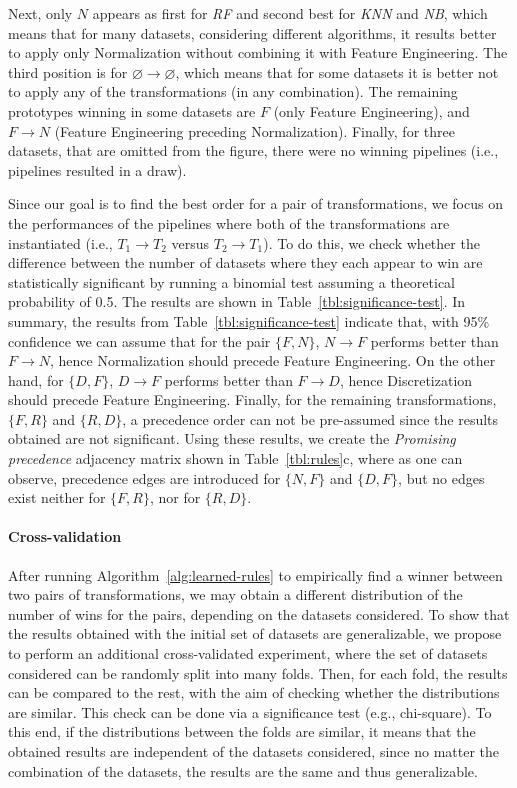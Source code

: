 \begin{example}
Next, only $N$ appears as first for \textit{RF} and second best for \textit{KNN} and \textit{NB}, which means that for many datasets, considering different algorithms, it results better to apply only Normalization without combining it with Feature Engineering. The third position is for $\varnothing\rightarrow \varnothing$, which means that for some datasets it is better not to apply any of the transformations (in any combination). The remaining prototypes winning in some datasets are $F$ (only Feature Engineering), and $F \rightarrow N$ (Feature Engineering preceding Normalization).  Finally, for three datasets, that are omitted from the figure, there were no winning pipelines (i.e., pipelines resulted in a draw).

Since our goal is to find the best order for a pair of transformations, we focus on the performances of the pipelines where both of the transformations are instantiated (i.e., $T_1\rightarrow T_2$ versus $T_2\rightarrow T_1$). To do this, we check whether the difference between the number of datasets where they each appear to win are statistically significant by running a binomial test assuming a theoretical probability of 0.5. The results are shown in Table~\ref{tbl:significance-test}.
In summary, the results from Table~\ref{tbl:significance-test} indicate that, with 95\% confidence we can assume that for the pair $\{F,N\}$, $N\rightarrow F$ performs better than $F\rightarrow N$, hence Normalization should precede Feature Engineering. On the other hand, for $\{D,F\}$, $D\rightarrow F$ performs better than $F\rightarrow D$, hence Discretization should precede Feature Engineering. Finally, for the remaining transformations, $\{F,R\}$ and $\{R,D\}$, a precedence order can not be pre-assumed since the results obtained are not significant. 
Using these results, we create the \textit{Promising precedence} adjacency matrix shown in Table~\ref{tbl:rules}c, where as one can observe, precedence edges are introduced for $\{N,F\}$ and $\{D,F\}$, but no edges exist neither for $\{F,R\}$, nor for $\{R,D\}$. 
\end{example}

\paragraph{Cross-validation}
\label{sec:learned-rules-validation}
After running Algorithm~\ref{alg:learned-rules} to empirically find a winner between two pairs of transformations, we may obtain a different distribution of the number of wins for the pairs, depending on the datasets considered. To show that the results obtained with the initial set of datasets are generalizable, we propose to perform an additional cross-validated experiment, where the set of datasets considered can be randomly split into many folds. Then, for each fold, the results can be compared to the rest, with the aim of checking whether the distributions are similar. This check can be done via a significance test (e.g., chi-square). To this end, if the distributions between the folds are similar, it means that the obtained results are independent of the datasets considered, since no matter the combination of the datasets, the results are the same and thus generalizable.


